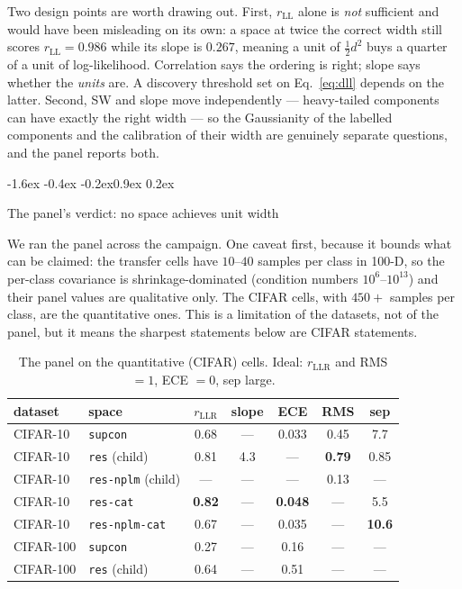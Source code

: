 \documentclass{article}
\makeatletter
\renewcommand\subsection{\@startsection{subsection}{2}{\z@}%
  {-1.6ex \@plus -0.4ex \@minus -0.2ex}{0.9ex \@plus 0.2ex}%
  {\normalsize\bf\raggedright}}
\newcommand{\best}[1]{\textbf{#1}}
\makeatother
\begin{document}
Two design points are worth drawing out. First, $r_{\mathrm{LL}}$ alone is
\emph{not} sufficient and would have been misleading on its own: a space at
twice the correct width still scores $r_{\mathrm{LL}}=0.986$ while its slope is
$0.267$, meaning a unit of $\tfrac12 d^2$ buys a quarter of a unit of
log-likelihood. Correlation says the ordering is right; slope says whether the
\emph{units} are. A discovery threshold set on Eq.~\eqref{eq:dll} depends on the
latter. Second, SW and slope move independently --- heavy-tailed components can
have exactly the right width --- so the Gaussianity of the labelled components
and the calibration of their width are genuinely separate questions, and the
panel reports both.

\subsection{The panel's verdict: no space achieves unit width}
\label{sec:panel-results}

We ran the panel across the campaign. One caveat first, because it bounds what
can be claimed: the transfer cells have $10$--$40$ samples per class in 100-D,
so the per-class covariance is shrinkage-dominated (condition numbers
$10^6$--$10^{13}$) and their panel values are qualitative only. The CIFAR cells,
with $450+$ samples per class, are the quantitative ones. This is a limitation
of the datasets, not of the panel, but it means the sharpest statements below
are CIFAR statements.

\begin{table}[t]\centering\small
\begin{tabular}{llccccc}
\toprule
dataset & space & $r_{\mathrm{LLR}}$ & slope & ECE & RMS & sep \\
\midrule
CIFAR-10 & \texttt{supcon} & 0.68 & --- & 0.033 & 0.45 & 7.7 \\
CIFAR-10 & \texttt{res} (child) & 0.81 & 4.3 & --- & \best{0.79} & 0.85 \\
CIFAR-10 & \texttt{res-nplm} (child) & --- & --- & --- & 0.13 & --- \\
CIFAR-10 & \texttt{res-cat} & \best{0.82} & --- & \best{0.048} & --- & 5.5 \\
CIFAR-10 & \texttt{res-nplm-cat} & 0.67 & --- & 0.035 & --- & \best{10.6} \\
CIFAR-100 & \texttt{supcon} & 0.27 & --- & 0.16 & --- & --- \\
CIFAR-100 & \texttt{res} (child) & 0.64 & --- & 0.51 & --- & --- \\
\bottomrule
\end{tabular}
\caption{The panel on the quantitative (CIFAR) cells. Ideal: $r_{\mathrm{LLR}}$
and RMS $=1$, ECE $=0$, sep large.}
\label{tab:panel-real}
\end{table}
\end{document}
